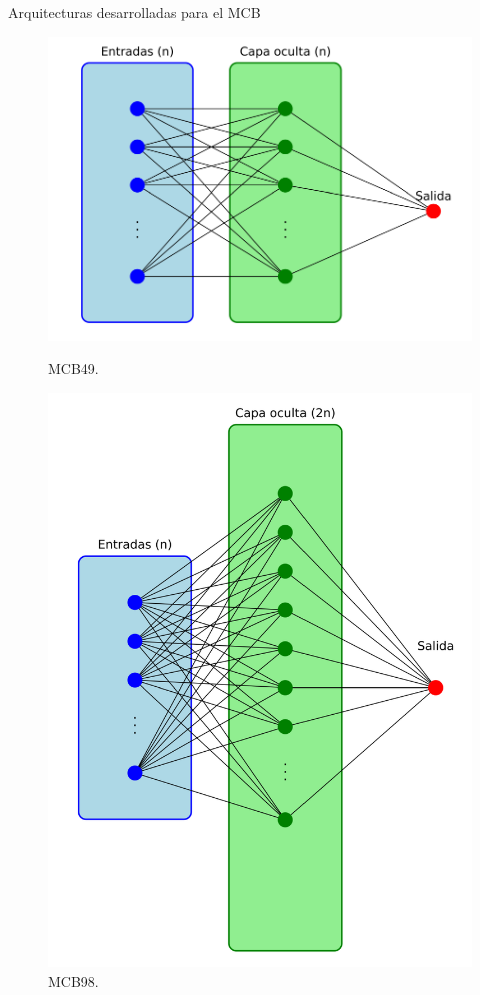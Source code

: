 \begin{frame}{Arquitecturas desarrolladas para el MCB}
\begin{figure}[H]
{	    \begin{minipage}{0.3\textwidth}
    			\centering
		    \includegraphics[width=\linewidth]{../Memoria/img/modelo/arquitecturas/arqnBIN.pdf}
		    \caption{MCB49.}
	    \end{minipage}	
	    \hspace{.5cm}
	        
	    \begin{minipage}{0.3\textwidth}
    			\centering
		    \includegraphics[width=\linewidth]{../Memoria/img/modelo/arquitecturas/arqnnBIN.pdf}
		    \caption{MCB98.}
	    \end{minipage}
	    }
	\end{figure}
	

\end{frame}
